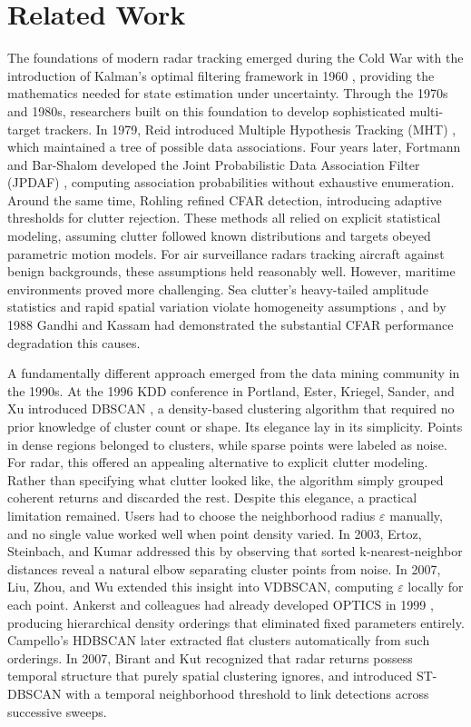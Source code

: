 \documentclass[conf]{new-aiaa}
\begin{document}
\section{Related Work}

The foundations of modern radar tracking emerged during the Cold War with the introduction of Kalman's optimal filtering framework in 1960 \cite{Kalman1960}, providing the mathematics needed for state estimation under uncertainty. Through the 1970s and 1980s, researchers built on this foundation to develop sophisticated multi-target trackers. In 1979, Reid introduced Multiple Hypothesis Tracking (MHT) \cite{Reid1979}, which maintained a tree of possible data associations. Four years later, Fortmann and Bar-Shalom developed the Joint Probabilistic Data Association Filter (JPDAF) \cite{Fortmann1983}, computing association probabilities without exhaustive enumeration. Around the same time, Rohling \cite{Rohling1983} refined CFAR detection, introducing adaptive thresholds for clutter rejection. These methods all relied on explicit statistical modeling, assuming clutter followed known distributions and targets obeyed parametric motion models. For air surveillance radars tracking aircraft against benign backgrounds, these assumptions held reasonably well. However, maritime environments proved more challenging. Sea clutter's heavy-tailed amplitude statistics and rapid spatial variation violate homogeneity assumptions \cite{Ward1981}, and by 1988 Gandhi and Kassam \cite{Gandhi1988} had demonstrated the substantial CFAR performance degradation this causes.

A fundamentally different approach emerged from the data mining community in the 1990s. At the 1996 KDD conference in Portland, Ester, Kriegel, Sander, and Xu introduced DBSCAN \cite{Ester1996}, a density-based clustering algorithm that required no prior knowledge of cluster count or shape. Its elegance lay in its simplicity. Points in dense regions belonged to clusters, while sparse points were labeled as noise. For radar, this offered an appealing alternative to explicit clutter modeling. Rather than specifying what clutter looked like, the algorithm simply grouped coherent returns and discarded the rest. Despite this elegance, a practical limitation remained. Users had to choose the neighborhood radius $\varepsilon$ manually, and no single value worked well when point density varied. In 2003, Ertoz, Steinbach, and Kumar \cite{Ertoz2003} addressed this by observing that sorted k-nearest-neighbor distances reveal a natural elbow separating cluster points from noise. In 2007, Liu, Zhou, and Wu \cite{Liu2007} extended this insight into VDBSCAN, computing $\varepsilon$ locally for each point. Ankerst and colleagues had already developed OPTICS in 1999 \cite{Ankerst1999}, producing hierarchical density orderings that eliminated fixed parameters entirely. Campello's HDBSCAN \cite{Campello2013} later extracted flat clusters automatically from such orderings. In 2007, Birant and Kut \cite{Birant2007} recognized that radar returns possess temporal structure that purely spatial clustering ignores, and introduced ST-DBSCAN with a temporal neighborhood threshold to link detections across successive sweeps.
\end{document}
